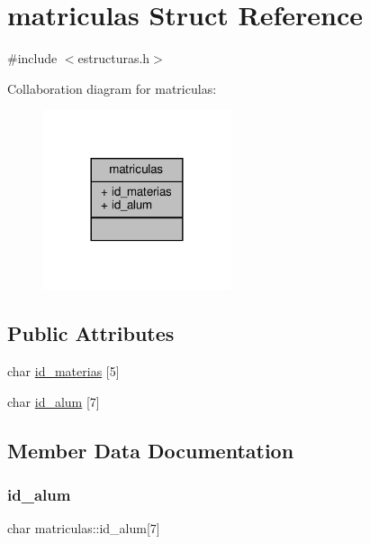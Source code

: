 \hypertarget{structmatriculas}{}\section{matriculas Struct Reference}
\label{structmatriculas}


{\ttfamily \#include $<$estructuras.\+h$>$}



Collaboration diagram for matriculas\+:\nopagebreak
\begin{figure}[H]
\begin{center}
\leavevmode
\includegraphics[width=156pt]{structmatriculas__coll__graph}
\end{center}
\end{figure}
\subsection*{Public Attributes}
\begin{DoxyCompactItemize}
\item 
char \mbox{\hyperlink{structmatriculas_a6433d557ea453570a08401f83be557d0}{id\+\_\+materias}} \mbox{[}5\mbox{]}
\item 
char \mbox{\hyperlink{structmatriculas_aff338fa16ed08905b6e2b214d743fb41}{id\+\_\+alum}} \mbox{[}7\mbox{]}
\end{DoxyCompactItemize}


\subsection{Member Data Documentation}
\mbox{\label{structmatriculas_aff338fa16ed08905b6e2b214d743fb41}} 
\subsubsection{\texorpdfstring{id\+\_\+alum}{id\_alum}}
{\footnotesize\ttfamily char matriculas\+::id\+\_\+alum\mbox{[}7\mbox{]}}

